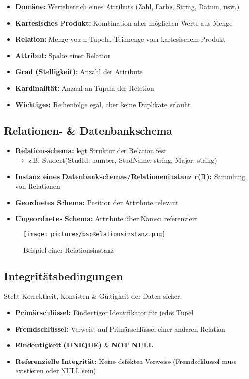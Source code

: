 \documentclass[12pt,a4paper]{article}
\begin{document}
\begin{itemize}
\item \textbf{Domäne:} Wertebereich eines Attributs (Zahl, Farbe, String, Datum, usw.)
\item \textbf{Kartesisches Produkt:} Kombination aller möglichen Werte aus Menge
\item \textbf{Relation:} Menge von n-Tupeln, Teilmenge vom kartesischem Produkt
\item \textbf{Attribut:} Spalte einer Relation
\item \textbf{Grad (Stelligkeit):} Anzahl der Attribute
\item \textbf{Kardinalität:} Anzahl an Tupeln der Relation
\item \textbf{Wichtiges:} Reihenfolge egal, aber keine Duplikate erlaubt
\end{itemize}

\subsection{Relationen- \& Datenbankschema}

\begin{itemize}
\item \textbf{Relationsschema:} legt Struktur der Relation fest \\
$\rightarrow$ z.B. Student(StudId: number, StudName: string, Major: string)
\item \textbf{Instanz eines Datenbankschemas/Relationeninstanz r(R):} Sammlung von Relationen
\item \textbf{Geordnetes Schema:} Position der Attribute relevant
\item \textbf{Ungeordnetes Schema:} Attribute über Namen referenziert
\end{itemize}

\begin{figure}[H]
\centering
\texttt{[image: pictures/bspRelationsinstanz.png]}
\caption{Beispiel einer Relationsinstanz}
\end{figure}

\subsection{Integritätsbedingungen}

Stellt Korrektheit, Konsisten \& Gültigkeit der Daten sicher:
\begin{itemize}
\item \textbf{Primärschlüssel:} Eindeutiger Identifikator für jedes Tupel
\item \textbf{Fremdschlüssel:} Verweist auf Primärschlüssel einer anderen Relation
\item \textbf{Eindeutigkeit (UNIQUE)} \& \textbf{NOT NULL}
\item \textbf{Referenzielle Integrität:} Keine defekten Verweise (Fremdschlüssel muss existieren oder NULL sein)
\end{itemize}
\end{document}
